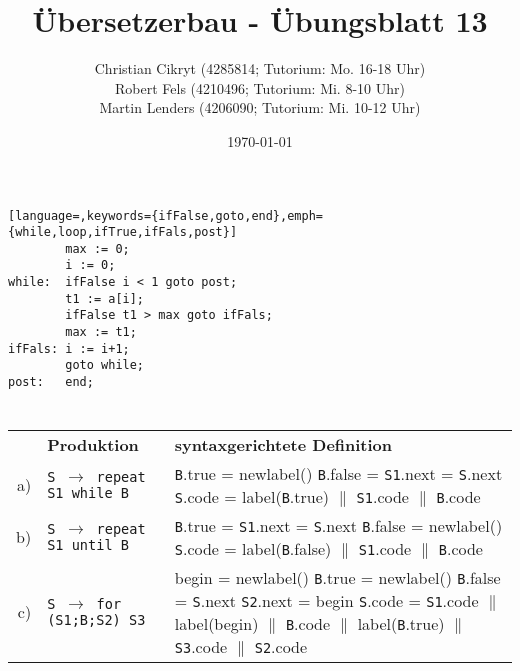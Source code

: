 \documentclass[a4paper,10pt]{scrartcl}
\title{Übersetzerbau - Übungsblatt 13}
\author{Christian Cikryt (4285814; Tutorium: Mo. 16-18 Uhr)\\
  Robert Fels (4210496; Tutorium: Mi. 8-10 Uhr)\\
  Martin Lenders (4206090; Tutorium: Mi. 10-12 Uhr)
  }
\date{\today}
\begin{document}
\maketitle

\section{}
\begin{lstlisting}[language=,keywords={ifFalse,goto,end},emph={while,loop,ifTrue,ifFals,post}]
        max := 0;
        i := 0;
while:  ifFalse i < 1 goto post;
        t1 := a[i];
        ifFalse t1 > max goto ifFals;
        max := t1;
ifFals: i := i+1;
        goto while;
post:   end;
\end{lstlisting}
\section{}
\begin{center}
	\begin{tabular}{rl|p{.6\linewidth}}
		& \textbf{Produktion} & \textbf{syntaxgerichtete Definition} \\\cline{2-3}\cline{2-3}
		a) & \texttt{S $\to$ repeat S1 while B} & 
			\texttt{B}.true = newlabel() \newline
			\texttt{B}.false = \texttt{S1}.next = \texttt{S}.next \newline
			\texttt{S}.code = label(\texttt{B}.true) $\|$ \texttt{S1}.code $\|$ \texttt{B}.code \\\cline{2-3}
		b) & \texttt{S $\to$ repeat S1 until B} & 
			\texttt{B}.true = \texttt{S1}.next = \texttt{S}.next \newline
			\texttt{B}.false = newlabel() \newline
			\texttt{S}.code = label(\texttt{B}.false) $\|$ \texttt{S1}.code $\|$ \texttt{B}.code \\\cline{2-3}
		c) & \texttt{S $\to$ for (S1;B;S2) S3} & 
			begin = newlabel() \newline
			\texttt{B}.true = newlabel() \newline
			\texttt{B}.false = \texttt{S}.next \newline
			\texttt{S2}.next = begin \newline
			\texttt{S}.code = \texttt{S1}.code $\|$ label(begin) $\|$ \texttt{B}.code $\|$ label(\texttt{B}.true) $\|$ \texttt{S3}.code $\|$ \texttt{S2}.code
	\end{tabular}
\end{center}\newpage
\end{document}

